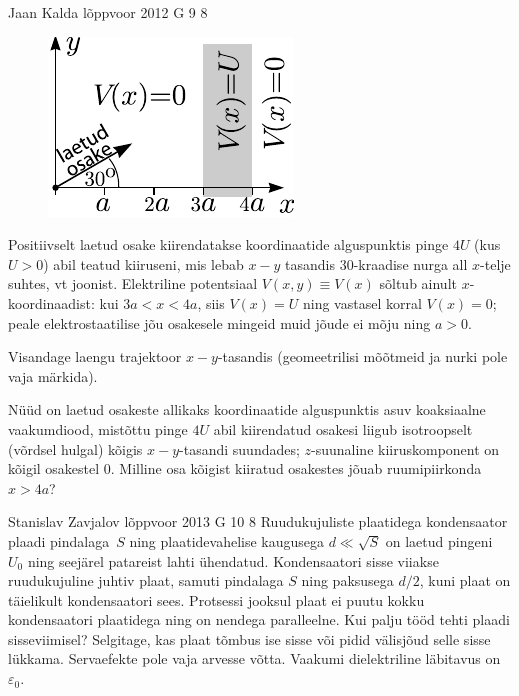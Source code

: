 \documentclass[11pt, twoside]{article}
\begin{document}
{%
{Jaan Kalda} %
{lõppvoor} %
{2012} %
{G 9} %
{8} %
{
\ifStatement
\begin{figure}%
\vspace{-10pt}
\includegraphics[width=\linewidth]{2012-v3g-09-laeng}%
\end{figure}
Positiivselt laetud osake kiirendatakse koordinaatide alguspunktis pinge $4U$ (kus $U>0$) abil teatud kiiruseni, mis
lebab $x-y$ tasandis $30$-kraadise nurga all $x$-telje suhtes, vt joonist. Elektriline potentsiaal $V(x,y)\equiv V(x)$
sõltub ainult $x$-koordinaadist: kui
$3a<x<4a$, siis $V(x)=U$ ning vastasel korral $V(x)=0$; peale elektrostaatilise jõu osakesele mingeid muid jõude ei mõju ning $a>0$.

\osa Visandage laengu trajektoor $x-y$-tasandis (geomeetrilisi mõõtmeid ja nurki pole vaja märkida).

\osa Nüüd on laetud osakeste allikaks koordinaatide alguspunktis asuv koaksiaalne vaakumdiood, mistõttu pinge $4U$
abil kiirendatud osakesi liigub isotroopselt (võrdsel hulgal) kõigis $x-y$-tasandi suundades;
$z$-suunaline kiiruskomponent on kõigil osakestel 0. Milline osa kõigist kiiratud osakestes jõuab ruumipiirkonda $x>4a$?
\fi
}

{Stanislav Zavjalov} %
{lõppvoor} %
{2013} %
{G 10} %
{8} %
{
\ifStatement
Ruudukujuliste plaatidega kondensaator plaadi pindalaga~$S$ ning plaatidevahelise
kaugusega $d \ll \sqrt{S}$ on laetud pingeni $U_0$ ning seejärel
patareist lahti ühendatud. Kondensaatori sisse viiakse ruudukujuline juhtiv
plaat, samuti pindalaga $S$ ning paksusega $d/2$, kuni plaat on täielikult
kondensaatori sees. Protsessi jooksul plaat ei puutu kokku
kondensaatori plaatidega ning on nendega paralleelne. Kui palju tööd tehti
plaadi sisseviimisel? Selgitage, kas plaat tõmbus ise sisse või pidid välisjõud
selle sisse lükkama. Servaefekte pole vaja arvesse võtta. Vaakumi dielektriline
läbitavus on $\varepsilon_0$.
\fi
}

}
\end{document}
